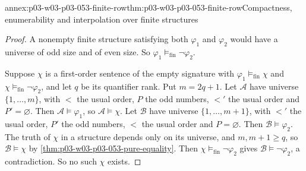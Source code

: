 \begin{annexitem}{annex:p03-w03-p03-053-finite-row}{thm:p03-w03-p03-053-finite-row}{Compactness, enumerability and interpolation over finite structures}
\begin{proof}
A nonempty finite structure satisfying both \(\varphi_1\) and
\(\varphi_2\) would have a universe of odd size and of even size. So
\(\varphi_1\models_{\mathrm{fin}}\neg\varphi_2\).

Suppose \(\chi\) is a first-order sentence of the empty signature with
\(\varphi_1\models_{\mathrm{fin}}\chi\) and
\(\chi\models_{\mathrm{fin}}\neg\varphi_2\), and let \(q\) be its
quantifier rank. Put \(m=2q+1\). Let \(\mathcal A\) have universe
\(\{1,\ldots,m\}\), with \(<\) the usual order, \(P\) the odd numbers,
\(<'\) the usual order and \(P'=\varnothing\). Then
\(\mathcal A\models\varphi_1\), so \(\mathcal A\models\chi\). Let
\(\mathcal B\) have universe \(\{1,\ldots,m+1\}\), with \(<'\) the usual
order, \(P'\) the odd numbers, \(<\) the usual order and
\(P=\varnothing\). Then \(\mathcal B\models\varphi_2\). The truth of
\(\chi\) in a structure depends only on its universe, and
\(m,m+1\ge q\), so \(\mathcal B\models\chi\) by
\cref{thm:p03-w03-p03-053-pure-equality}. Then
\(\chi\models_{\mathrm{fin}}\neg\varphi_2\) gives
\(\mathcal B\models\neg\varphi_2\), a contradiction. So no such
\(\chi\) exists.
\end{proof}
\end{annexitem}

